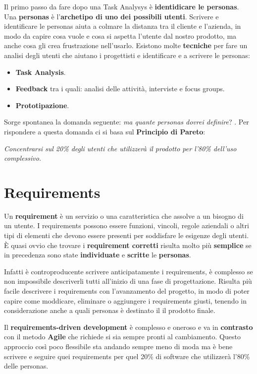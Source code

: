 \documentclass[a4paper,11pt,oneside]{book}
\begin{document}
Il primo passo da fare dopo una Task Analysys è \textbf{identidicare le personas}.
Una \textbf{personas} è l'\textbf{archetipo di uno dei possibili utenti}. Scrivere e
identificare le personas aiuta a colmare la distanza tra il cliente e l'azienda, in modo da capire cosa vuole e cosa si aspetta l'utente dal nostro prodotto, ma anche cosa gli crea frustrazione nell'usarlo. Esistono molte \textbf{tecniche} per fare un analisi degli utenti che aiutano i progettisti e identificare e a scrivere le personas:

\begin{itemize}
	\item \textbf{Task Analysis}.
	\item \textbf{Feedback} tra i quali: analisi delle attività, interviste e focus groups.
	\item \textbf{Prototipazione}.
\end{itemize}

Sorge spontanea la domanda seguente: \textit{ma quante personas dovrei definire}? .
Per rispondere a questa domanda ci si basa sul \textbf{Principio di Pareto}: \begin{center}
	\textit{Concentrarsi sul 20\% degli utenti che utilizzerà il prodotto per l'80\% dell'uso complessivo.}
\end{center}

\pagebreak

\section{Requirements}

Un \textbf{requirement} è un servizio o una caratteristica che assolve a un bisogno di un utente.
I requirements possono essere funzioni, vincoli, regole aziendali o altri tipi di elementi che devono essere presenti per soddisfare le esigenze degli utenti. È quasi ovvio che trovare i \textbf{requirement corretti} risulta molto più \textbf{semplice} se in precedenza sono state \textbf{individuate} e \textbf{scritte} le \textbf{personas}.

Infatti è controproducente scrivere anticipatamente i requirements,
è complesso se non impossibile descriverli tutti all'inizio di una fase di progettazione. Risulta più facile descrivere i requirements con l'avanzamento del progetto, in modo di poter capire come moddicare, eliminare o aggiungere i requirements giusti, tenendo in considerazione anche a quali personas è destinato il il prodotto finale.

Il \textbf{requirements-driven development} è complesso e oneroso e va in \textbf{contrasto} con il metodo \textbf{Agile} che richiede si sia sempre pronti al cambiamento. Questo approccio così poco flessibile sta andando sempre meno di moda ma è bene scrivere e seguire quei requirements per quel 20\% di software che utilizzerà l'80\% delle personas.
\end{document}
